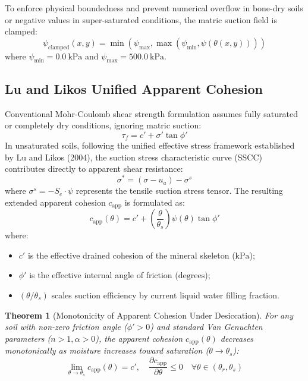 \documentclass[11pt,a4paper]{article}
\newtheorem{theorem}{Theorem}[section]
\theoremstyle{definition}
\theoremstyle{remark}
\begin{document}
To enforce physical boundedness and prevent numerical overflow in bone-dry soils or negative values in super-saturated conditions, the matric suction field is clamped:
\begin{equation}
    \psi_{\text{clamped}}(x, y) = \min\left( \psi_{\max}, \max\left( \psi_{\min}, \psi(\theta(x, y)) \right) \right)
\end{equation}
where $\psi_{\min} = 0.0~\text{kPa}$ and $\psi_{\max} = 500.0~\text{kPa}$.

\subsection{Lu and Likos Unified Apparent Cohesion}
Conventional Mohr-Coulomb shear strength formulation assumes fully saturated or completely dry conditions, ignoring matric suction:
\begin{equation}
    \tau_f = c' + \sigma' \tan \phi'
\end{equation}
In unsaturated soils, following the unified effective stress framework established by Lu and Likos (2004), the suction stress characteristic curve (SSCC) contributes directly to apparent shear resistance:
\begin{equation}
    \sigma^* = (\sigma - u_a) - \sigma^s
\end{equation}
where $\sigma^s = -S_e \cdot \psi$ represents the tensile suction stress tensor. The resulting extended apparent cohesion $c_{\text{app}}$ is formulated as:
\begin{equation}
    c_{\text{app}}(\theta) = c' + \left( \frac{\theta}{\theta_s} \right) \psi(\theta) \tan \phi'
    \label{eq:apparent_cohesion_lu}
\end{equation}
\noindent where:
\begin{itemize}
    \item $c'$ is the effective drained cohesion of the mineral skeleton ($\text{kPa}$);
    \item $\phi'$ is the effective internal angle of friction ($\text{degrees}$);
    \item $(\theta / \theta_s)$ scales suction efficiency by current liquid water filling fraction.
\end{itemize}

\begin{theorem}[Monotonicity of Apparent Cohesion Under Desiccation]
    For any soil with non-zero friction angle ($\phi' > 0$) and standard Van Genuchten parameters ($n > 1, \alpha > 0$), the apparent cohesion $c_{\text{app}}(\theta)$ decreases monotonically as moisture increases toward saturation ($\theta \to \theta_s$):
    \begin{equation}
        \lim_{\theta \to \theta_s} c_{\text{app}}(\theta) = c', \quad \frac{\partial c_{\text{app}}}{\partial \theta} \le 0 \quad \forall \theta \in (\theta_r, \theta_s)
    \end{equation}
\end{theorem}
\end{document}
